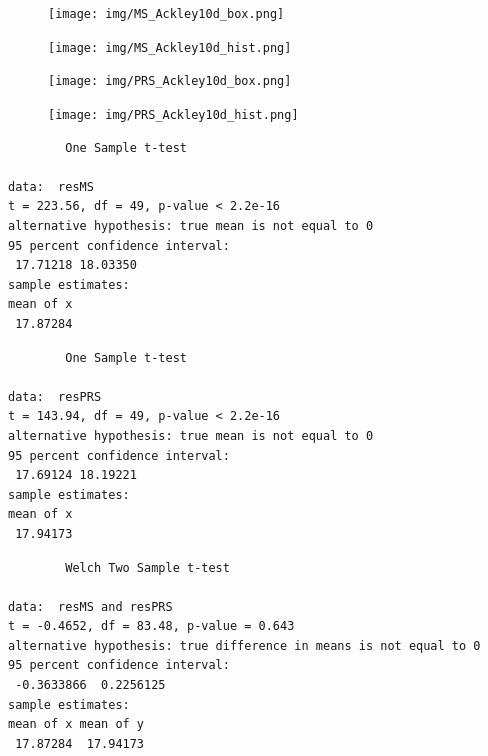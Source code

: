 \documentclass{article}
\begin{document}
\begin{figure}[H]
    \centering
    \texttt{[image: img/MS\_Ackley10d\_box.png]}
    \label{fig:ackley}
\end{figure}

\begin{figure}[H]
    \centering
    \texttt{[image: img/MS\_Ackley10d\_hist.png]}
    \label{fig:ackley}
\end{figure}

\begin{figure}[H]
    \centering
    \texttt{[image: img/PRS\_Ackley10d\_box.png]}
    \label{fig:ackley}
\end{figure}

\begin{figure}[H]
    \centering
    \texttt{[image: img/PRS\_Ackley10d\_hist.png]}
    \label{fig:ackley}
\end{figure}

\newpage
\vspace{25pt}

\begin{verbatim}
        One Sample t-test

data:  resMS
t = 223.56, df = 49, p-value < 2.2e-16
alternative hypothesis: true mean is not equal to 0
95 percent confidence interval:
 17.71218 18.03350
sample estimates:
mean of x
 17.87284
\end{verbatim}

\vspace{50pt}

\begin{verbatim}
        One Sample t-test

data:  resPRS
t = 143.94, df = 49, p-value < 2.2e-16
alternative hypothesis: true mean is not equal to 0
95 percent confidence interval:
 17.69124 18.19221
sample estimates:
mean of x
 17.94173
\end{verbatim}

\vspace{50pt}

\begin{verbatim}
        Welch Two Sample t-test

data:  resMS and resPRS
t = -0.4652, df = 83.48, p-value = 0.643
alternative hypothesis: true difference in means is not equal to 0
95 percent confidence interval:
 -0.3633866  0.2256125
sample estimates:
mean of x mean of y
 17.87284  17.94173
\end{verbatim}

\newpage
\end{document}
